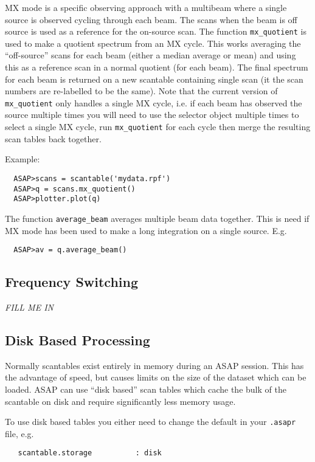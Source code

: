 \documentclass[11pt]{article}
\newcommand{\cmd}[1]{{\tt #1}}
\begin{document}
MX mode is a specific observing approach with a multibeam where a
single source is observed cycling through each beam. The scans when
the beam is off source is used as a reference for the on-source
scan. The function \cmd{mx\_quotient} is used to make a quotient
spectrum from an MX cycle. This works averaging the ``off-source''
scans for each beam (either a median average or mean) and using this
as a reference scan in a normal quotient (for each beam). The final
spectrum for each beam is returned on a new scantable containing
single scan (it the scan numbers are re-labelled to be the same). Note
that the current version of \cmd{mx\_quotient} only handles a single
MX cycle, i.e. if each beam has observed the source multiple times you
will need to use the selector object multiple times to select a single
MX cycle, run \cmd{mx\_quotient} for each cycle then merge the
resulting scan tables back together.

Example:

\begin{verbatim}
  ASAP>scans = scantable('mydata.rpf')
  ASAP>q = scans.mx_quotient()
  ASAP>plotter.plot(q)
\end{verbatim}

The function \cmd{average\_beam} averages multiple beam data
together. This is need if MX mode has been used to make a long
integration on a single source. E.g.

\begin{verbatim}
  ASAP>av = q.average_beam()
\end{verbatim}

\subsection{Frequency Switching}

{\em FILL ME IN}

\subsection{Disk Based Processing}

Normally scantables exist entirely in memory during an ASAP
session. This has the advantage of speed, but causes limits on the
size of the dataset which can be loaded. ASAP can use ``disk based''
scan tables which cache the bulk of the scantable on disk and require
significantly less memory usage.

To use disk based tables you either need to change the default in your
\cmd{.asapr} file, e.g.
\begin{verbatim}
   scantable.storage          : disk
\end{verbatim}
\end{document}
